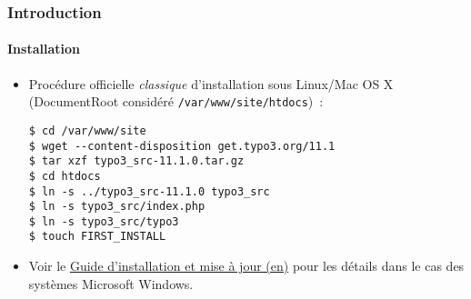 %

\begin{frame}[fragile]
	\frametitle{Introduction}
	\framesubtitle{Installation}


	\begin{itemize}
		\item Procédure officielle \textit{classique} d'installation sous Linux/Mac OS X\newline
			(DocumentRoot considéré \texttt{/var/www/site/htdocs})~:
\begin{lstlisting}
$ cd /var/www/site
$ wget --content-disposition get.typo3.org/11.1
$ tar xzf typo3_src-11.1.0.tar.gz
$ cd htdocs
$ ln -s ../typo3_src-11.1.0 typo3_src
$ ln -s typo3_src/index.php
$ ln -s typo3_src/typo3
$ touch FIRST_INSTALL
\end{lstlisting}

		\item Voir le \href{https://docs.typo3.org/m/typo3/guide-installation/master/en-us/}{Guide d'installation et mise à jour (en)}
			pour les détails dans le cas des systèmes Microsoft Windows.

	\end{itemize}
\end{frame}

